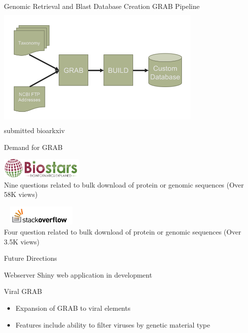 \documentclass[11pt]{beamer}
\begin{document}
	\begin{frame}{Genomic Retrieval and Blast Database Creation}
	\center
	GRAB Pipeline
	\includegraphics[height=6cm, width=10cm]{GRAB.png}
	\\
	\tiny{submitted bioarkxiv}
	\end{frame}
	

	\begin{frame}{Demand for GRAB}

	\includegraphics[height=1cm, width=4cm]{biostars.png} \\
	Nine questions related to bulk download of protein or genomic sequences (Over 58K views) 
	
	\includegraphics[height=1cm, width=4cm]{stack.png} \\
	Four question related to bulk download of protein or genomic sequences (Over 3.5K views)
	
	
	\end{frame}
	
	\begin{frame}{Future Directions}
	\begin{block}{Webserver}
	Shiny web application in development
	\end{block}
	
	\begin{block}{Viral GRAB}
	\begin{itemize}
	\item Expansion of GRAB to viral elements
	\item Features include ability to filter viruses by genetic material type
	\end{itemize}
	\end{block}
	\end{frame}
	
\end{document}
